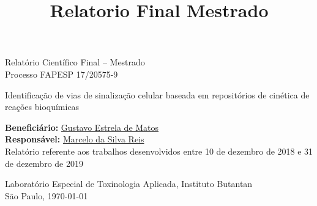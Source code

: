 \documentclass[12pt]{article}
\title{Relatorio Final Mestrado}
\begin{document}
%
\doublespacing

\begin{titlepage}
    \vfill 
    \begin{center}
        {\Large Relatório Científico Final -- Mestrado\\
         \bigskip
         Processo FAPESP 17/20575-9
        }
        
        \bigskip
        \bigskip
    
        {\LARGE Identificação de vias de sinalização celular baseada em
        repositórios de cinética de reações bioquímicas}

        \bigskip
        \bigskip
        {\Large {\bf Beneficiário:}
        \href{mailto:gustavo.estrela.matos@usp.br}{Gustavo Estrela de
        Matos}\\ 
        
        {\bf Responsável:}
        \href{mailto:marcelo.reis@butantan.gov.br}{Marcelo da Silva
        Reis}\\

        \bigskip
        \bigskip
        \bigskip
        \bigskip
        \bigskip
        \bigskip
        \bigskip
        Relatório referente aos trabalhos desenvolvidos entre 10 de
        dezembro de 2018 e 31 de dezembro de 2019

        \bigskip
        \bigskip
        \bigskip
        \bigskip
        \bigskip
        \bigskip
        \bigskip

        Laboratório Especial de Toxinologia Aplicada, Instituto
        Butantan\\
        \bigskip
        São Paulo, \today\\
        }

        \bigskip
        \bigskip

       

\end{center}
\end{titlepage}


\tableofcontents

\pagebreak
\end{document}
